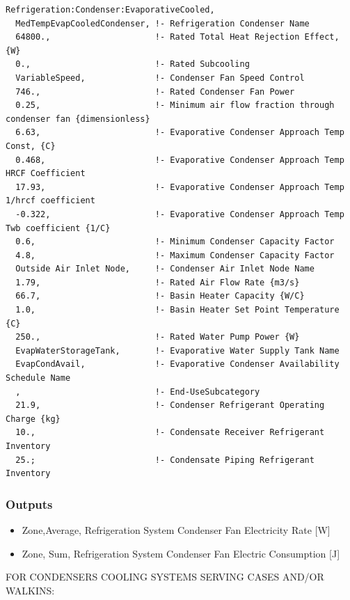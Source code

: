 \begin{lstlisting}
Refrigeration:Condenser:EvaporativeCooled,
  MedTempEvapCooledCondenser, !- Refrigeration Condenser Name
  64800.,                     !- Rated Total Heat Rejection Effect, {W}
  0.,                         !- Rated Subcooling
  VariableSpeed,              !- Condenser Fan Speed Control
  746.,                       !- Rated Condenser Fan Power
  0.25,                       !- Minimum air flow fraction through condenser fan {dimensionless}
  6.63,                       !- Evaporative Condenser Approach Temp Const, {C}
  0.468,                      !- Evaporative Condenser Approach Temp HRCF Coefficient
  17.93,                      !- Evaporative Condenser Approach Temp 1/hrcf coefficient
  -0.322,                     !- Evaporative Condenser Approach Temp Twb coefficient {1/C}
  0.6,                        !- Minimum Condenser Capacity Factor
  4.8,                        !- Maximum Condenser Capacity Factor
  Outside Air Inlet Node,     !- Condenser Air Inlet Node Name
  1.79,                       !- Rated Air Flow Rate {m3/s}
  66.7,                       !- Basin Heater Capacity {W/C}
  1.0,                        !- Basin Heater Set Point Temperature {C}
  250.,                       !- Rated Water Pump Power {W}
  EvapWaterStorageTank,       !- Evaporative Water Supply Tank Name
  EvapCondAvail,              !- Evaporative Condenser Availability Schedule Name
  ,                           !- End-UseSubcategory
  21.9,                       !- Condenser Refrigerant Operating Charge {kg}
  10.,                        !- Condensate Receiver Refrigerant Inventory
  25.;                        !- Condensate Piping Refrigerant Inventory
\end{lstlisting}

\subsubsection{Outputs}\label{outputs-7-008}

\begin{itemize}
\item
  Zone,Average, Refrigeration System Condenser Fan Electricity Rate {[}W{]}
\item
  Zone, Sum, Refrigeration System Condenser Fan Electric Consumption {[}J{]}
\end{itemize}

FOR CONDENSERS COOLING SYSTEMS SERVING CASES AND/OR WALKINS:

